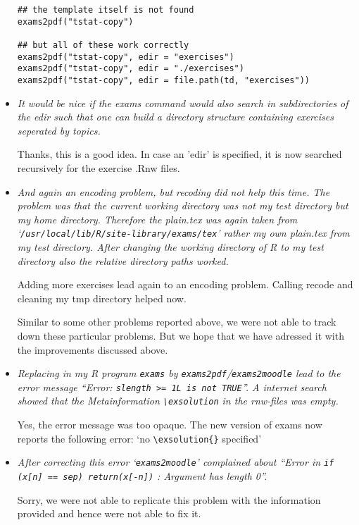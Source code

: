 \documentclass[a4paper]{article}
\begin{document}
\begin{itemize}
\begin{verbatim}
## the template itself is not found
exams2pdf("tstat-copy")

## but all of these work correctly
exams2pdf("tstat-copy", edir = "exercises")
exams2pdf("tstat-copy", edir = "./exercises")
exams2pdf("tstat-copy", edir = file.path(td, "exercises"))
\end{verbatim}

\item {\it
It would be
nice if the exams command would also search in subdirectories of the edir
such that one can build a directory structure containing exercises
seperated by topics.}

Thanks, this is a good idea. In case an 'edir' is specified, it is now searched
recursively for the exercise .Rnw files.

\item {\it
And again an encoding problem, but recoding did not help this time. The
problem was that the current working directory was not my test directory
but my home directory.  Therefore the plain.tex was again taken from
`\texttt{/usr/local/lib/R/site-library/exams/tex}' rather my own plain.tex from my
test directory.  After changing the working directory of R to my test
directory also the relative directory paths worked.

Adding more exercises lead again to an encoding problem. Calling recode
and cleaning my tmp directory helped now.}

Similar to some other problems reported above, we were not able to track down
these particular problems. But we hope that we have adressed it with the
improvements discussed above.

\item {\it
Replacing in my R program \texttt{exams} by \texttt{exams2pdf}/\texttt{exams2moodle} lead to
the error message ``Error: \texttt{slength >= 1L is not TRUE}''.  A internet search
showed that the Metainformation \verb|\exsolution| in the rnw-files was empty.}

Yes, the error message was too opaque. The new version of exams now reports
the following error: `no \verb|\exsolution{}| specified'

\item {\it
After correcting this error `\texttt{exams2moodle}' complained about ``Error in
\texttt{if (x[n] == sep) return(x[-n])} : Argument has length 0''.}

Sorry, we were not able to replicate this problem with the information provided
and hence were not able to fix it.


\end{itemize}
\end{document}
